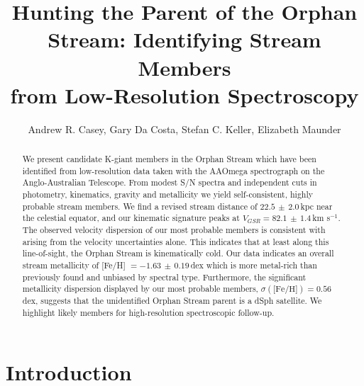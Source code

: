 \documentclass[10pt,apjl]{emulateapj}
\begin{document}


\title{Hunting the Parent of the Orphan Stream: Identifying Stream Members \\ from Low-Resolution Spectroscopy}

\author{Andrew R. Casey, Gary Da Costa, Stefan C. Keller, Elizabeth Maunder}

\begin{abstract}
We present candidate K-giant members in the Orphan Stream which have been identified from low-resolution data taken with the AAOmega spectrograph on the Anglo-Australian Telescope. From modest S/N spectra and independent cuts in photometry, kinematics, gravity and metallicity we yield self-consistent, highly probable stream members. We find a revised stream distance of $22.5\,\pm\,2.0$\,kpc near the celestial equator, and our kinematic signature peaks at $V_{GSR} = 82.1\,\pm\,1.4$\,km s$^{-1}$. The observed velocity dispersion of our most probable members is consistent with arising from the velocity uncertainties alone. This indicates that at least along this line-of-sight, the Orphan Stream is kinematically cold. Our data indicates an overall stream metallicity of [Fe/H] $= -1.63\,\pm\,0.19$\,dex which is more metal-rich than previously found and unbiased by spectral type. Furthermore, the significant metallicity dispersion displayed by our most probable members, $\sigma(\mbox{[Fe/H]}) = 0.56$\,dex, suggests that the unidentified Orphan Stream parent is a dSph satellite. We highlight likely members for high-resolution spectroscopic follow-up.
\end{abstract}


\section{Introduction}
\label{sec:introduction}
\end{document}
